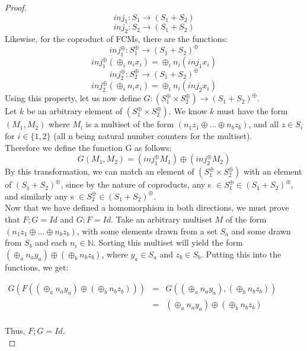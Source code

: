 \begin{lemma}
\begin{proof}
\[inj_1: S_1 \rightarrow (S_1 + S_2) \]
\[inj_2: S_2 \rightarrow (S_1 + S_2)\]
Likewise, for the coproduct of FCMs, there are the functions: \\
\[inj^\oplus_1: S_1^\oplus \rightarrow (S_1 + S_2)^\oplus  \]
\[inj^\oplus_1(\oplus_i n_i x_i) = \oplus_i n_i(inj_1 x_i)\]
\smallskip
\[inj^\oplus_2: S_2^\oplus \rightarrow (S_1 + S_2)^\oplus \]
\[ inj^\oplus_2(\oplus_i n_i x_i) = \oplus_i n_i(inj_2 x_i)\]
Using this property, let us now define $G: (S_1 ^\oplus \times S_2 ^\oplus) \rightarrow (S_1 + S_2)^\oplus$.\\
Let $k$ be an arbitrary element of $(S_1 ^\oplus \times S_2 ^\oplus)$. We know $k$ must have the form $(M_1 , M_2)$ where $M_i$ is a multiset of the form $(n_1z_1 \oplus ... \oplus n_bz_b)$, and all $z \in S_i$ for $i\in\{1, 2\}$ (all n being natural number counters for the multiset).\\
Therefore we define the function G as follows:\\
\[G(M_1, M_2) = (inj_1^\oplus M_1) \oplus (inj_2^\oplus M_2)\]
By this transformation, we can match an element of $(S_1 ^\oplus \times S_2 ^\oplus)$ with an element of $(S_1 + S_2)^\oplus$, since by the nature of coproducts, any s $\in S_1^\oplus \in (S_1+S_2)^\oplus$, and similarly any s $\in S_2^\oplus \in (S_1+S_2)^\oplus$.\bigskip \\

Now that we have defined a homomorphism in both directions, we must
prove that $F;G = Id$ and $G;F = Id$. Take an arbitrary multiset $M$
of the form $(n_1z_1 \oplus ... \oplus n_bz_b)$, with some elements
drawn from a set $S_a$ and some drawn from $S_b$ and each $n_i \in
\mathbb{N}$. Sorting this multiset will yield the form $(\oplus_a n_a
y_a) \oplus (\oplus_b n_b z_b)$, where $y_a \in S_a$ and $z_b \in
S_b$. Putting this into the functions, we get:
\begin{center}
  \begin{math}
    \begin{array}{lll}
      G(F((\oplus_a n_a y_a) \oplus (\oplus_b n_b z_b)))
      & = & G((\oplus_a n_a y_a), (\oplus_b n_b z_b))\\
      & = & (\oplus_a n_a y_a) \oplus (\oplus_b n_b z_b)\\
    \end{array}
  \end{math}
\end{center}
Thus, $F;G = Id$.\\


\end{proof}
\end{lemma}
